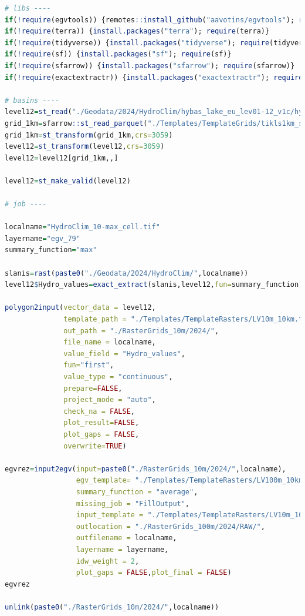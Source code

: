 \documentclass[
]{book}
\begin{document}
\begin{lstlisting}[language=R]
# libs ----
if(!require(egvtools)) {remotes::install_github("aavotins/egvtools"); require(egvtools)}
if(!require(terra)) {install.packages("terra"); require(terra)}
if(!require(tidyverse)) {install.packages("tidyverse"); require(tidyverse)}
if(!require(sf)) {install.packages("sf"); require(sf)}
if(!require(sfarrow)) {install.packages("sfarrow"); require(sfarrow)}
if(!require(exactextractr)) {install.packages("exactextractr"); require(exactextractr)}

# basins ----
level12=st_read("./Geodata/2024/HydroClim/hybas_lake_eu_lev01-12_v1c/hybas_lake_eu_lev12_v1c.shp")
grid_1km=sfarrow::st_read_parquet("./Templates/TemplateGrids/tikls1km_sauzeme.parquet")
grid_1km=st_transform(grid_1km,crs=3059)
level12=st_transform(level12,crs=3059)
level12=level12[grid_1km,,]

level12=st_make_valid(level12)

# job ----

localname="HydroClim_10-max_cell.tif"
layername="egv_79"
summary_function="max"
  
slanis=rast(paste0("./Geodata/2024/HydroClim/",localname))
level12$Hydro_values=exact_extract(slanis,level12,fun=summary_function)
  
polygon2input(vector_data = level12,
              template_path = "./Templates/TemplateRasters/LV10m_10km.tif",
              out_path = "./RasterGrids_10m/2024/",
              file_name = localname,
              value_field = "Hydro_values",
              fun="first",
              value_type = "continuous",
              prepare=FALSE,
              project_mode = "auto",
              check_na = FALSE,
              plot_result=FALSE,
              plot_gaps = FALSE,
              overwrite=TRUE)
  
egvrez=input2egv(input=paste0("./RasterGrids_10m/2024/",localname),
                 egv_template= "./Templates/TemplateRasters/LV100m_10km.tif",
                 summary_function = "average",
                 missing_job = "FillOutput",
                 input_template = "./Templates/TemplateRasters/LV10m_10km.tif",
                 outlocation = "./RasterGrids_100m/2024/RAW/",
                 outfilename = localname,
                 layername = layername,
                 idw_weight = 2,
                 plot_gaps = FALSE,plot_final = FALSE)
egvrez
  
unlink(paste0("./RasterGrids_10m/2024/",localname))
\end{lstlisting}
\end{document}
